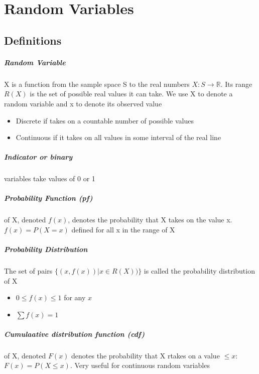 \chapter{Random Variables}
  \section{Definitions}
    \paragraph{Random Variable} X is a function from the sample space S to the
    real numbers $X : S \rightarrow \mathbb{R}$. Its range $R(X)$ is the set of
    possible real values it can take. We use X to denote a random variable and
    x to denote its observed value
    \begin{itemize}
      \item Discrete if takes on a countable number of possible values
      \item Continuous if it takes on all values in some interval of the real
      line
    \end{itemize}

    \paragraph{Indicator or binary} variables take values of 0 or 1

    \paragraph{Probability Function (pf)} of X, denoted $f(x)$, denotes the
    probability that X takes on the value x. $f(x) = P(X = x)$ defined for all
    x in the range of X

    \paragraph{Probability Distribution} The set of pairs $\{(x, f(x)) | x \in
    R(X))\}$ is called the probability distribution of X
    \begin{itemize}
      \item $0 \leq f(x) \leq 1$ for any $x$
      \item $\sum f(x) = 1$
    \end{itemize}

    \paragraph{Cumulaative distribution function (cdf)} of X, denoted $F(x)$
    denotes the probability that X rtakes on a value $\leq x$: $F(x) = P(X
    \leq x)$. Very useful for continuous random variables

